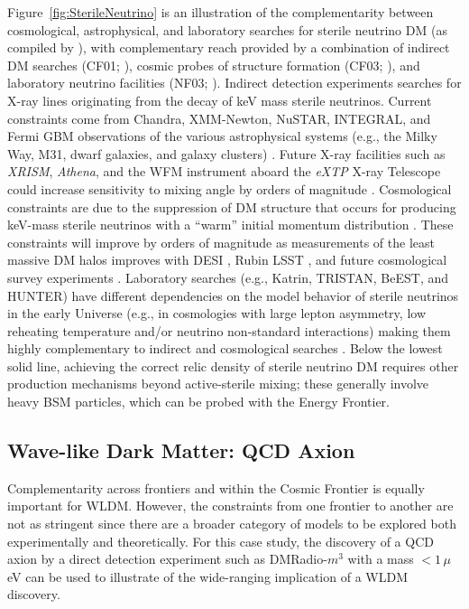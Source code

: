 \documentclass[nofootinbib]{article}
\begin{document}



Figure~\ref{fig:SterileNeutrino} is an illustration of the complementarity between cosmological, astrophysical, and laboratory searches for sterile neutrino DM (as compiled by \cite{Abazajian:2022ofy}), with complementary reach provided by a combination of indirect DM searches (CF01; \cite{Cooley:2022ufh}), cosmic probes of structure formation (CF03; \cite{Drlica-Wagner:2022lbd}), and laboratory neutrino facilities (NF03; \cite{Coloma:2022dng}). 
Indirect detection experiments searches for X-ray lines originating from the decay of keV mass sterile neutrinos. 
Current constraints come from Chandra, XMM-Newton, NuSTAR, INTEGRAL, and Fermi GBM observations of the various astrophysical systems (e.g., the Milky Way, M31, dwarf galaxies, and galaxy clusters) \cite{Horiuchi:2013noa,Boyarsky:2005us,Boyarsky:2006zi,Abazajian:2006jc,Malyshev:2014xqa,Sicilian:2020glg,Foster:2021ngm,Roach:2019ctw}. 
Future X-ray facilities such as {\it XRISM}, {\it Athena}, and the WFM instrument aboard the {\it eXTP} X-ray Telescope could increase sensitivity to mixing angle by orders of magnitude \cite{Neronov:2015kca,Zhong:2020wre,Malyshev:2020hcc,Ando:2021fhj}.
Cosmological constraints are due to the suppression of DM structure that occurs for producing keV-mass sterile neutrinos with a ``warm'' initial momentum distribution \cite{Bullock:2017xww,Schneider:2016uqi}.
These constraints will improve by orders of magnitude as measurements of the least massive DM halos improves with DESI \cite{Valluri:2022nrh}, Rubin LSST \cite{Mao:2022fyx}, and future cosmological survey experiments \cite{Chakrabarti:2022cbu}.
Laboratory searches (e.g., Katrin, TRISTAN, BeEST, and HUNTER) \cite{Merle:2017jfn,KATRIN:2018oow,Friedrich:2020nze,Martoff:2021vxp} have different dependencies on the model behavior of sterile neutrinos in the early Universe (e.g., in cosmologies with large lepton asymmetry, low reheating temperature and/or neutrino non-standard interactions) making them highly complementary to indirect and cosmological searches \cite{Gelmini:2019clw, Gelmini:2019wfp}. Below the lowest solid line, achieving the correct relic density of sterile neutrino DM requires other production mechanisms beyond active-sterile mixing; these generally involve heavy BSM particles, which can be probed with the Energy Frontier. 

\subsection{Wave-like Dark Matter: QCD Axion}
\label{sub:axion}
Complementarity across frontiers and within the Cosmic Frontier is equally important for WLDM. However, the constraints from one frontier to another are not as stringent since there are a broader category of models to be explored both experimentally and theoretically.  For this case study, the discovery of a QCD axion by a direct detection experiment such as DMRadio-$m^3$ with a mass $< 1\,\mu$eV can be used to illustrate of the wide-ranging implication of a WLDM discovery. 
\end{document}
